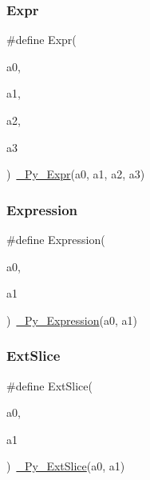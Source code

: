 \mbox{\label{_python-ast_8h_a5f27997222de791e41ad21dd595b9a33}} 
\subsubsection{\texorpdfstring{Expr}{Expr}}
{\footnotesize\ttfamily \#define Expr(\begin{DoxyParamCaption}\item[{}]{a0,  }\item[{}]{a1,  }\item[{}]{a2,  }\item[{}]{a3 }\end{DoxyParamCaption})~\mbox{\hyperlink{_python-ast_8h_a2c246c3845b9932449f5a9afdabc2683}{\+\_\+\+Py\+\_\+\+Expr}}(a0, a1, a2, a3)}

\mbox{\label{_python-ast_8h_a8c5273fe38597ee6607481e31b440f85}} 
\subsubsection{\texorpdfstring{Expression}{Expression}}
{\footnotesize\ttfamily \#define Expression(\begin{DoxyParamCaption}\item[{}]{a0,  }\item[{}]{a1 }\end{DoxyParamCaption})~\mbox{\hyperlink{_python-ast_8h_a87521a69a46a2f948409cfc6e4a8e8cf}{\+\_\+\+Py\+\_\+\+Expression}}(a0, a1)}

\mbox{\label{_python-ast_8h_a897a049777d959d56f82a2cd25114f8d}} 
\subsubsection{\texorpdfstring{ExtSlice}{ExtSlice}}
{\footnotesize\ttfamily \#define Ext\+Slice(\begin{DoxyParamCaption}\item[{}]{a0,  }\item[{}]{a1 }\end{DoxyParamCaption})~\mbox{\hyperlink{_python-ast_8h_a2b4bdfbc6abd001f33a02e5a205fbf1a}{\+\_\+\+Py\+\_\+\+Ext\+Slice}}(a0, a1)}

